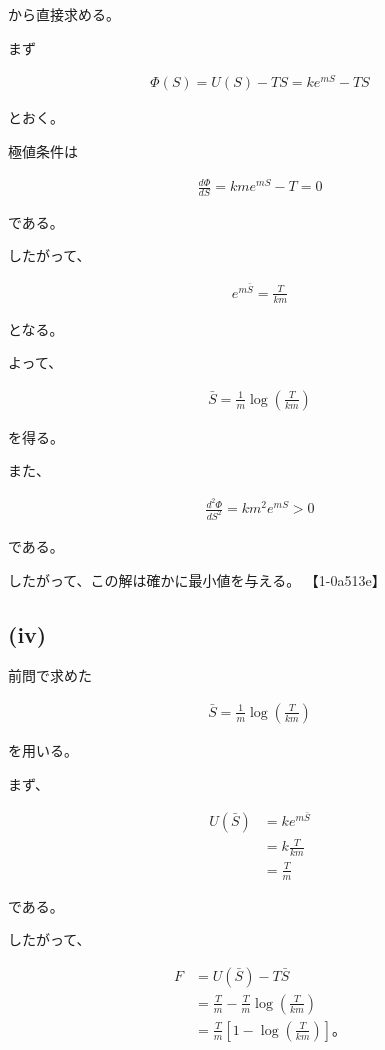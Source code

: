\documentclass[platex,dvipdfmx,a4paper]{jsarticle}
\begin{document}
から直接求める。

まず

\begin{align*}
\Phi(S)
=
U(S)-TS
=
ke^{mS}-TS
\end{align*}

とおく。

極値条件は

\begin{align*}
\frac{d\Phi}{dS}
=
kme^{mS}-T
=
0
\end{align*}

である。

したがって、

\begin{align*}
e^{m\bar S}
=
\frac{T}{km}
\end{align*}

となる。

よって、

\begin{align*}
\bar S
=
\frac1m
\log
\left(
\frac{T}{km}
\right)
\end{align*}

を得る。

また、

\begin{align*}
\frac{d^2\Phi}{dS^2}
=
km^2e^{mS}
>
0
\end{align*}

である。

したがって、この解は確かに最小値を与える。 【1-0a513e】

\subsection{(iv)}

前問で求めた

\begin{align*}
\bar S
=
\frac1m
\log
\left(
\frac{T}{km}
\right)
\end{align*}

を用いる。

まず、

\begin{align*}
U(\bar S)
&=
ke^{m\bar S}
\\
&=
k
\frac{T}{km}
\\
&=
\frac{T}{m}
\end{align*}

である。

したがって、

\begin{align*}
F
&=
U(\bar S)-T\bar S
\\
&=
\frac{T}{m}
-
\frac{T}{m}
\log
\left(
\frac{T}{km}
\right)
\\
&=
\frac{T}{m}
\left[
1-
\log
\left(
\frac{T}{km}
\right)
\right]。
\end{align*}
\end{document}
